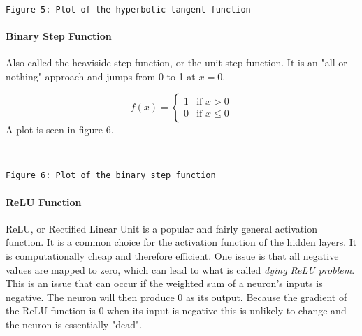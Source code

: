 \documentclass[11pt]{article}
\begin{document}
    \begin{center}
    \end{center}
    { \hspace*{\fill} \\}
    
    \begin{Verbatim}[commandchars=\\\{\}]
Figure 5: Plot of the hyperbolic tangent function
    \end{Verbatim}

    \hypertarget{binary-step-function}{%
\paragraph{Binary Step Function}\label{binary-step-function}}

Also called the heaviside step function, or the unit step function. It
is an "all or nothing" approach and jumps from 0 to 1 at \(x=0\).

\[
f(x) =
\left\{
    \begin{array}{ll}
        1  & \mbox{if } x > 0 \\
        0 & \mbox{if } x \leq 0
    \end{array}
\right.
\] 
A plot is seen in figure 6.


    \begin{center}
    \end{center}
    { \hspace*{\fill} \\}
    
    \begin{Verbatim}[commandchars=\\\{\}]
Figure 6: Plot of the binary step function
    \end{Verbatim}

    \hypertarget{relu-function}{%
\paragraph{ReLU Function}\label{relu-function}}

ReLU, or Rectified Linear Unit is a popular and fairly general
activation function. It is a common choice for the activation function
of the hidden layers. It is computationally cheap and therefore
efficient. One issue is that all negative values are mapped to zero,
which can lead to what is called \emph{dying ReLU problem}. This is an
issue that can occur if the weighted sum of a neuron's inputs is
negative. The neuron will then produce 0 as its output. Because the
gradient of the ReLU function is 0 when its input is negative this is
unlikely to change and the neuron is essentially "dead".
\end{document}
